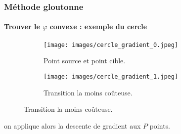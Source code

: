 \documentclass{beamer}
\begin{document}
\begin{frame}
	\frametitle{Méthode gloutonne}
	\framesubtitle{Trouver le $\varphi$ convexe : exemple du cercle}
	
	\begin{figure}[!htb]
		\centering
		\begin{subfigure}{0.4\textwidth}
			\centering
			\texttt{[image: images/cercle\_gradient\_0.jpeg]}
			\caption{Point source et point cible.}
		\end{subfigure}
		\hspace*{\fill}
		\begin{subfigure}{0.4\textwidth}
			\centering 
			\texttt{[image: images/cercle\_gradient\_1.jpeg]}
			\caption{Transition la moins coûteuse.}
		\end{subfigure}
	\end{figure}

	\begin{flushright}
		on applique alors la descente de gradient aux $P$ points.
	\end{flushright}


\end{frame}
\end{document}

